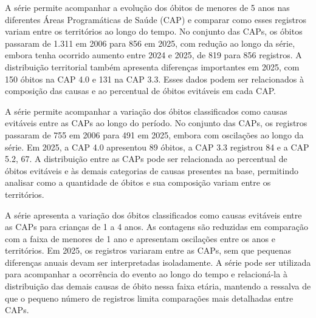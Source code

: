 
A série permite acompanhar a evolução dos óbitos de menores de 5 anos nas diferentes Áreas Programáticas de Saúde (CAP) e comparar como esses registros variam entre os territórios ao longo do tempo. No conjunto das CAPs, os óbitos passaram de 1.311 em 2006 para 856 em 2025, com redução ao longo da série, embora tenha ocorrido aumento entre 2024 e 2025, de 819 para 856 registros. A distribuição territorial também apresenta diferenças importantes em 2025, com 150 óbitos na CAP 4.0 e 131 na CAP 3.3. Esses dados podem ser relacionados à composição das causas e ao percentual de óbitos evitáveis em cada CAP.


A série permite acompanhar a variação dos óbitos classificados como causas evitáveis entre as CAPs ao longo do período. No conjunto das CAPs, os registros passaram de 755 em 2006 para 491 em 2025, embora com oscilações ao longo da série. Em 2025, a CAP 4.0 apresentou 89 óbitos, a CAP 3.3 registrou 84 e a CAP 5.2, 67. A distribuição entre as CAPs pode ser relacionada ao percentual de óbitos evitáveis e às demais categorias de causas presentes na base, permitindo analisar como a quantidade de óbitos e sua composição variam entre os territórios.


A série apresenta a variação dos óbitos classificados como causas evitáveis entre as CAPs para crianças de 1 a 4 anos. As contagens são reduzidas em comparação com a faixa de menores de 1 ano e apresentam oscilações entre os anos e territórios. Em 2025, os registros variaram entre as CAPs, sem que pequenas diferenças anuais devam ser interpretadas isoladamente. A série pode ser utilizada para acompanhar a ocorrência do evento ao longo do tempo e relacioná-la à distribuição das demais causas de óbito nessa faixa etária, mantendo a ressalva de que o pequeno número de registros limita comparações mais detalhadas entre CAPs.

